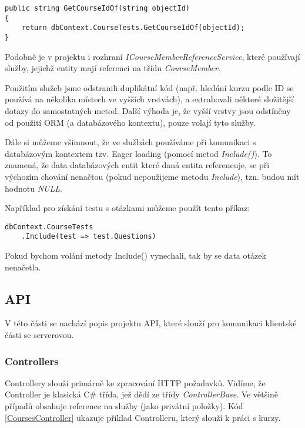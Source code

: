 \begin{lstlisting}
public string GetCourseIdOf(string objectId)
{
	return dbContext.CourseTests.GetCourseIdOf(objectId);
}
\end{lstlisting}

Podobně je v projektu i rozhraní \textit{ICourseMemberReferenceService}, které používají služby, jejichž entity mají referenci na třídu \textit{CourseMember}.

Použitím služeb jsme odstranili duplikátní kód (např. hledání kurzu podle ID se používá na několika místech ve vyšších vrstvách), a extrahovali některé složitější dotazy do samostatných metod. Další výhoda je, že vyšší vrstvy jsou odstíněny od použití ORM (a databázového kontextu), pouze volají tyto služby.

Dále si můžeme všimnout, že ve službách používáme při komunikaci s databázovým kontextem tzv. Eager loading (pomocí metod \textit{Include()}). To znamená, že data databázových entit které daná entita referencuje, se při výchozím chování nenačtou (pokud nepoužijeme metodu \textit{Include}), tzn. budou mít hodnotu \textit{NULL}.

Například pro získání testu s otázkami můžeme použít tento příkaz:
\begin{lstlisting}
dbContext.CourseTests
	.Include(test => test.Questions)
\end{lstlisting}
Pokud bychom volání metody Include() vynechali, tak by se data otázek nenačetla.

\subsection{API}
V této části se nachází popis projektu API, které slouží pro komunikaci klientské části se serverovou.

\subsubsection*{Controllers}
Controllery slouží primárně ke zpracování HTTP požadavků. Vidíme, že Controller je klasická C\# třída, jež dědí ze třídy \textit{ControllerBase}. Ve většině případů obsahuje reference na služby (jako privátní položky). Kód \ref{CoursesController} ukazuje příklad Controlleru, který slouží k práci s kurzy.


